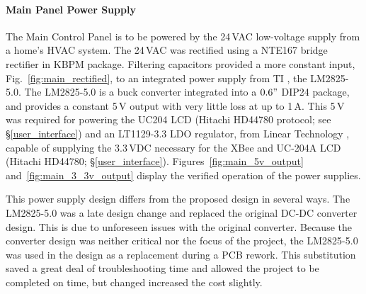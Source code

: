 \paragraph{Main Panel Power Supply}
The Main Control Panel is to be powered by the 24\,VAC low-voltage supply from a home's HVAC system. The 24\,VAC was rectified using a NTE167 bridge rectifier in KBPM package.  Filtering capacitors provided a more constant input, Fig.~\ref{fig:main_rectified}, to an integrated power supply from TI \cite{12}, the LM2825-5.0.  
The LM2825-5.0 is a buck converter integrated into a $0.6"$ DIP24 package, and provides a constant 5\,V output with very little loss at up to 1\,A.  This 5\,V was required for powering the UC204 LCD (Hitachi HD44780 protocol; see \S \ref{user_interface}) and an LT1129-3.3 LDO regulator, from Linear Technology \cite{11}, capable of supplying the 3.3\,VDC necessary for the XBee and UC-204A LCD (Hitachi HD44780; \S \ref{user_interface}). 
Figures~\ref{fig:main_5v_output} and~\ref{fig:main_3_3v_output} display the verified operation of the power supplies.

This power supply design differs from the proposed design in several ways.  The LM2825-5.0 was a late design change and replaced the original DC-DC converter design.  This is due to unforeseen issues with the original converter.  Because the converter design was neither critical nor the focus of the project, the LM2825-5.0 was used in the design as a replacement during a PCB rework.  This substitution saved a great deal of troubleshooting time and allowed the project to be completed on time, but changed increased the cost slightly.

